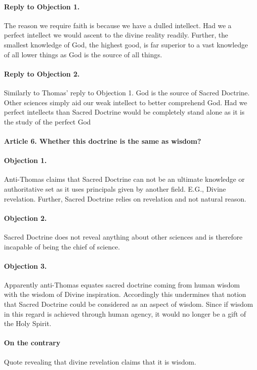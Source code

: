 \documentclass{ucetd}
\begin{document}
\paragraph{Reply to Objection 1.}
The reason we require faith is because we have a dulled intellect. Had we a perfect intellect we would ascent to the divine reality readily. Further, the smallest knowledge of God, the highest good, is far superior to a vast knowledge of all lower things as God is the source of all things.
\paragraph{Reply to Objection 2.}
Similarly to Thomas' reply to Objection 1. God is the source of Sacred Doctrine. Other sciences simply aid our weak intellect to better comprehend God. Had we perfect intellects than Sacred Doctrine would be completely stand alone as it is the study of the perfect God

\paragraph{Article 6. Whether this doctrine is the same as wisdom?}

\paragraph{Objection 1.}
Anti-Thomas claims that Sacred Doctrine can not be an ultimate knowledge or authoritative set as it uses principals given by another field. E.G., Divine revelation. Further, Sacred Doctrine relies on revelation and not natural reason.
\paragraph{Objection 2.}
Sacred Doctrine does not reveal anything about other sciences and is therefore incapable of being the chief of science.
\paragraph{Objection 3.}
Apparently anti-Thomas equates sacred doctrine coming from human wisdom with the wisdom of Divine inspiration. Accordingly this undermines that notion that Sacred Doctrine could be considered as an aspect of wisdom. Since if wisdom in this regard is achieved through human agency, it would no longer be a gift of the Holy Spirit.
\paragraph{On the contrary}
Quote revealing that divine revelation claims that it is wisdom.
\end{document}
